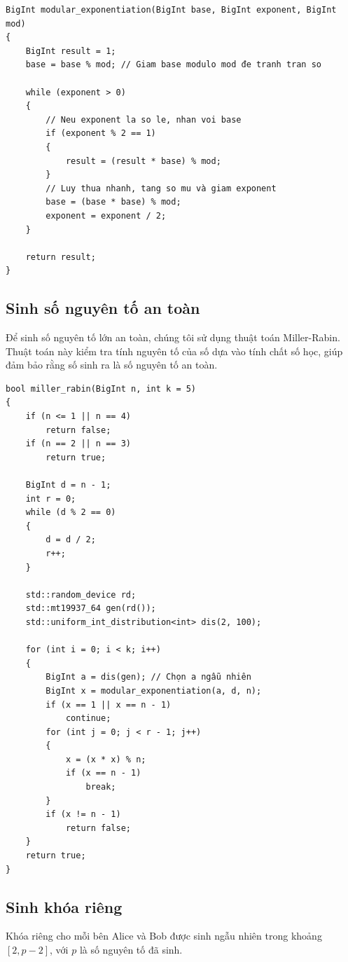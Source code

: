 \documentclass[a4paper,12pt]{article}
\begin{document}
\begin{lstlisting}
BigInt modular_exponentiation(BigInt base, BigInt exponent, BigInt mod)
{
    BigInt result = 1;
    base = base % mod; // Giam base modulo mod đe tranh tran so

    while (exponent > 0)
    {
        // Neu exponent la so le, nhan voi base
        if (exponent % 2 == 1)
        {
            result = (result * base) % mod;
        }
        // Luy thua nhanh, tang so mu và giam exponent
        base = (base * base) % mod;
        exponent = exponent / 2;
    }

    return result;
}

\end{lstlisting}

\subsection{Sinh số nguyên tố an toàn}
Để sinh số nguyên tố lớn an toàn, chúng tôi sử dụng thuật toán Miller-Rabin. Thuật toán này kiểm tra tính nguyên tố của số dựa vào tính chất số học, giúp đảm bảo rằng số sinh ra là số nguyên tố an toàn.

\begin{lstlisting}
bool miller_rabin(BigInt n, int k = 5)
{
    if (n <= 1 || n == 4)
        return false;
    if (n == 2 || n == 3)
        return true;

    BigInt d = n - 1;
    int r = 0;
    while (d % 2 == 0)
    {
        d = d / 2;
        r++;
    }

    std::random_device rd;
    std::mt19937_64 gen(rd());
    std::uniform_int_distribution<int> dis(2, 100);

    for (int i = 0; i < k; i++)
    {
        BigInt a = dis(gen); // Chọn a ngẫu nhiên
        BigInt x = modular_exponentiation(a, d, n);
        if (x == 1 || x == n - 1)
            continue;
        for (int j = 0; j < r - 1; j++)
        {
            x = (x * x) % n;
            if (x == n - 1)
                break;
        }
        if (x != n - 1)
            return false;
    }
    return true;
}
\end{lstlisting}

\subsection{Sinh khóa riêng}
Khóa riêng cho mỗi bên Alice và Bob được sinh ngẫu nhiên trong khoảng $[2, p-2]$, với $p$ là số nguyên tố đã sinh.
\end{document}
